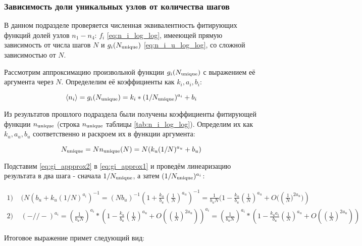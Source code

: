 \subsubsection{Зависимость доли уникальных узлов от количества шагов}

В данном подразделе проверяется численная эквивалентность фитирующих функций долей узлов $n_1-n_4$: $f_i$ \eqref{eq:n_i_log_log}, имееющей прямую зависимость от числа шагов $N$ и $g_i(N_{\textup{unique}})$ \eqref{eq:n_i_u_log_log}, со сложной зависимостью от $N$.

Рассмотрим аппроксимацию произвольной функции $g_i(N_{\textup{unique}})$ с выражением её аргумента через $N$. Определелим её коэффициенты как $k_i, a_i, b_i$:

\begin{equation}
	\langle n_i \rangle = g_i(N_{\textup{unique}}) = k_i * (1/N_{\textup{unique}})^{a_i} + b_i
	\label{eq:gi_approx1}
\end{equation}

Из результатов прошлого подраздела были получены коэффициенты фитирующей функции $n_{\textup{unique}}$ (строка $n_{\textup{unique}}$ таблицы \ref{tab:n_i_log_log}). Определим их как $k_u, a_u, b_u$ соответственно и раскроем их в функции аргумента: 

\begin{equation}
	N_{\textup{unique}} = N n_{\textup{unique}}(N) = N (k_u (1/N)^{a_u} + b_u)
	\label{eq:gi_appprox2}
\end{equation}


Подставим \eqref{eq:gi_appprox2} в \eqref{eq:gi_approx1} и проведём линеаризацию результата в два шага - сначала $1/N_{\textup{unique}}$, а затем $(1/N_{\textup{unique}})^{a_i}$:

\begin{large}
\begin{equation*}
\begin{array}{l}
1)\ \ \ \ \ (N (b_u + k_u(1/N)^{a_i})^{-1} = ( N b_u)^{-1} (1 + \frac{k_u}{b_u} (\frac{1}{N})^{a_u})^{-1} = \frac{1}{b_u N} (1 - \frac{k_u}{b_u} (\frac{1}{N})^{a_u} + O(\left(\frac{1}{N})^{2a_u})\right) \\

2)\ \ \ \ \ ( - // - )^{a_i}  = (\frac{1}{b_u N})^{a_i} * (1 - \frac{k_u}{b_u} (\frac{1}{N})^{a_u} + O(\left(\frac{1}{N}\right)^{2a_u}))^{a_i} =  (\frac{1}{b_u N})^{a_i} * (1 - \frac{k_u a_i}{b_u} (\frac{1}{N})^{a_u} + O(\left(\frac{1}{N}\right)^{2a_u}))
\end{array}
\end{equation*}
\end{large}

Итоговое выражение примет следующий вид:

